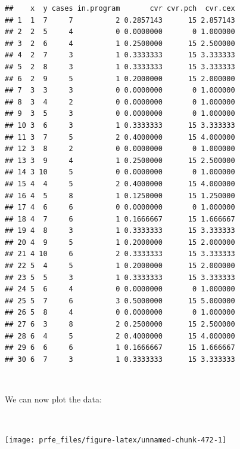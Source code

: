 \documentclass[12pt,a4paper]{book}
\newenvironment{Shaded}{\begin{snugshade}}{\end{snugshade}}
\newcommand{\KeywordTok}[1]{\textcolor[rgb]{0.13,0.29,0.53}{\textbf{#1}}}
\newcommand{\DataTypeTok}[1]{\textcolor[rgb]{0.13,0.29,0.53}{#1}}
\newcommand{\StringTok}[1]{\textcolor[rgb]{0.31,0.60,0.02}{#1}}
\newcommand{\OperatorTok}[1]{\textcolor[rgb]{0.81,0.36,0.00}{\textbf{#1}}}
\newcommand{\NormalTok}[1]{#1}
\theoremstyle{definition}
\theoremstyle{definition}
\theoremstyle{definition}
\theoremstyle{remark}
\begin{document}
\begin{verbatim}
##    x  y cases in.program       cvr cvr.pch  cvr.cex
## 1  1  7     7          2 0.2857143      15 2.857143
## 2  2  5     4          0 0.0000000       0 1.000000
## 3  2  6     4          1 0.2500000      15 2.500000
## 4  2  7     3          1 0.3333333      15 3.333333
## 5  2  8     3          1 0.3333333      15 3.333333
## 6  2  9     5          1 0.2000000      15 2.000000
## 7  3  3     3          0 0.0000000       0 1.000000
## 8  3  4     2          0 0.0000000       0 1.000000
## 9  3  5     3          0 0.0000000       0 1.000000
## 10 3  6     3          1 0.3333333      15 3.333333
## 11 3  7     5          2 0.4000000      15 4.000000
## 12 3  8     2          0 0.0000000       0 1.000000
## 13 3  9     4          1 0.2500000      15 2.500000
## 14 3 10     5          0 0.0000000       0 1.000000
## 15 4  4     5          2 0.4000000      15 4.000000
## 16 4  5     8          1 0.1250000      15 1.250000
## 17 4  6     6          0 0.0000000       0 1.000000
## 18 4  7     6          1 0.1666667      15 1.666667
## 19 4  8     3          1 0.3333333      15 3.333333
## 20 4  9     5          1 0.2000000      15 2.000000
## 21 4 10     6          2 0.3333333      15 3.333333
## 22 5  4     5          1 0.2000000      15 2.000000
## 23 5  5     3          1 0.3333333      15 3.333333
## 24 5  6     4          0 0.0000000       0 1.000000
## 25 5  7     6          3 0.5000000      15 5.000000
## 26 5  8     4          0 0.0000000       0 1.000000
## 27 6  3     8          2 0.2500000      15 2.500000
## 28 6  4     5          2 0.4000000      15 4.000000
## 29 6  6     6          1 0.1666667      15 1.666667
## 30 6  7     3          1 0.3333333      15 3.333333
\end{verbatim}

~

We can now plot the data:

~

\begin{Shaded}
\end{Shaded}

\begin{center}\texttt{[image: prfe\_files/figure-latex/unnamed-chunk-472-1]} \end{center}
\end{document}
